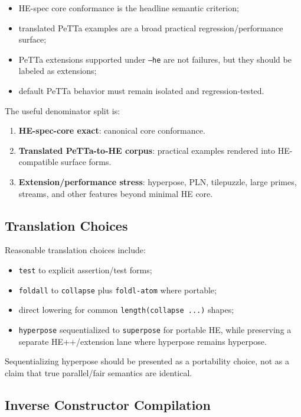 \documentclass[11pt]{article}
\newcommand{\PeTTa}{PeTTa}
\newcommand{\HE}{HE}
\begin{document}
\begin{itemize}[leftmargin=*]
  \item \HE{}-spec core conformance is the headline semantic criterion;
  \item translated \PeTTa{} examples are a broad practical regression/performance surface;
  \item \PeTTa{} extensions supported under \texttt{--he} are not failures, but they should be labeled as extensions;
  \item default \PeTTa{} behavior must remain isolated and regression-tested.
\end{itemize}

The useful denominator split is:

\begin{enumerate}[leftmargin=*]
  \item \textbf{HE-spec-core exact}: canonical core conformance.
  \item \textbf{Translated PeTTa-to-HE corpus}: practical examples rendered into HE-compatible surface forms.
  \item \textbf{Extension/performance stress}: hyperpose, PLN, tilepuzzle, large primes, streams, and other features beyond minimal HE core.
\end{enumerate}

\subsection{Translation Choices}

Reasonable translation choices include:

\begin{itemize}[leftmargin=*]
  \item \texttt{test} to explicit assertion/test forms;
  \item \texttt{foldall} to \texttt{collapse} plus \texttt{foldl-atom} where portable;
  \item direct lowering for common \texttt{length(collapse ...)} shapes;
  \item \texttt{hyperpose} sequentialized to \texttt{superpose} for portable HE, while preserving a separate HE++/extension lane where hyperpose remains hyperpose.
\end{itemize}

Sequentializing hyperpose should be presented as a portability choice, not as a claim that true parallel/fair semantics are identical.

\subsection{Inverse Constructor Compilation}
\end{document}

